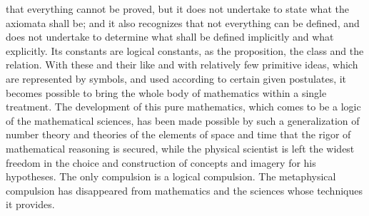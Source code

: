 \documentclass[12pt]{article}
\begin{document}
that everything cannot be proved, but it does not undertake
to state what the axiomata shall be; and it also
recognizes that not everything can be defined, and does
not undertake to determine what shall be defined implicitly
and what explicitly. Its constants are logical
constants, as the proposition, the class and the relation.
With these and their like and with relatively
few primitive ideas, which are represented by symbols,
and used according to certain given postulates, it becomes
possible to bring the whole body of mathematics
within a single treatment. The development of this
pure mathematics, which comes to be a logic of the
mathematical sciences, has been made possible by such
a generalization of number theory and theories of the
elements of space and time that the rigor of mathematical
reasoning is secured, while the physical
scientist is left the widest freedom in the choice
and construction of concepts and imagery for his
hypotheses. The only compulsion is a logical compulsion.
The metaphysical compulsion has disappeared
from mathematics and the sciences whose techniques it
provides.
\end{document}
